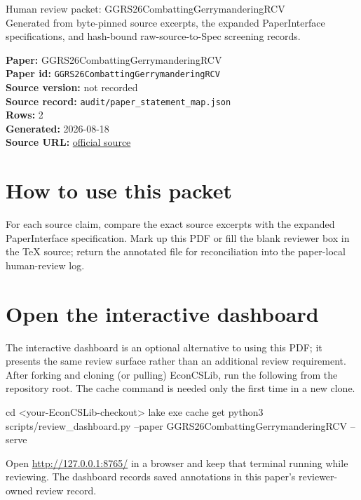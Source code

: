 \documentclass[10pt]{article}
\begin{document}
\fontsize{9}{10}\selectfont

\begin{center}
{\LARGE Human review packet: GGRS26CombattingGerrymanderingRCV}\\[0.35em]
\small Generated from byte-pinned source excerpts, the expanded PaperInterface
specifications, and hash-bound raw-source-to-Spec screening records.
\end{center}

\noindent\textbf{Paper:} GGRS26CombattingGerrymanderingRCV\\
\textbf{Paper id:} \texttt{GGRS26CombattingGerrymanderingRCV}\\
\textbf{Source version:} not recorded\\
\textbf{Source record:} \texttt{audit/paper\_statement\_map.json}\\
\textbf{Rows:} 2\\
\textbf{Generated:} 2026-08-18\\
\textbf{Source URL:} \href{https://arxiv.org/pdf/2107.07083.pdf}{official source}





\section*{How to use this packet}
For each source claim, compare the exact source excerpts with the expanded
PaperInterface specification. Mark up this PDF or fill the blank reviewer box in the TeX source;
return the annotated file for reconciliation into the paper-local human-review
log.

\section*{Open the interactive dashboard}
The interactive dashboard is an optional alternative to using this PDF; it
presents the same review surface rather than an additional review requirement.
After forking and cloning (or pulling) EconCSLib, run the following from the
repository root. The cache command is needed only the first time in a new clone.
\begin{ReviewVerbatim}
cd <your-EconCSLib-checkout>
lake exe cache get
python3 scripts/review_dashboard.py --paper GGRS26CombattingGerrymanderingRCV --serve
\end{ReviewVerbatim}
Open \url{http://127.0.0.1:8765/} in a browser and keep that terminal running
while reviewing. The dashboard records saved annotations in this paper's
reviewer-owned review record.
\end{document}
